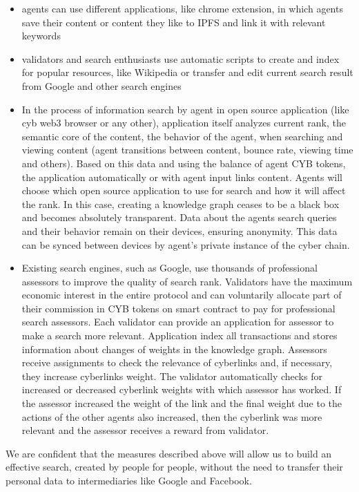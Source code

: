 \documentclass[8pt,oneside]{amsart}
\newcommand{\linkred}[2]{\href{#1}{\color{red}{#2}}}
\newcommand{\code}[1]{{\PlayBold #1}}
\begin{document}
\begin{itemize}
\item agents can use different applications, like \linkred{https://github.com/cybercongress/cyb-virus}{cyb.virus} chrome extension, in which agents save their content or content they like to IPFS and link it with relevant keywords
\item validators and search enthusiasts use automatic scripts to create and index for popular resources, like Wikipedia or transfer and edit current search result from Google and other search engines
\item In the process of information search by agent in open source application (like cyb web3 browser or any other), application itself analyzes current rank, the semantic core of the content, the behavior of the agent, when searching and viewing content  (agent transitions between content, bounce rate, viewing time and others). Based on this data and using the balance of agent CYB tokens, the application automatically or with agent input links content. Agents will choose which open source application to use for search and how it will affect the rank. In this case, creating a knowledge graph ceases to be a black box and becomes absolutely transparent. Data about the agents search queries and their behavior remain on their devices, ensuring anonymity. This data can be synced between devices by agent's private instance of the \code{cyber} chain.
\item Existing search engines, such as Google, use thousands of professional assessors to improve the quality of search rank. Validators have the maximum economic interest in the entire protocol and can voluntarily allocate part of their commission in CYB tokens on smart contract to pay for professional search assessors. Each validator can provide an application for assessor to make a search more relevant. Application index all transactions and stores information about changes of weights in the knowledge graph. Assessors receive assignments to check the relevance of cyberlinks and, if necessary, they increase cyberlinks weight. The validator automatically checks for increased or decreased cyberlink weights with which assessor has worked. If the assessor increased the weight of the link and the final weight due to the actions of the other agents also increased, then the cyberlink was more relevant and the assessor receives a reward from validator.
\end{itemize}

We are confident that the measures described above will allow us to build an effective search, created by people for people, without the need to transfer their personal data to intermediaries like Google and Facebook.
\end{document}
